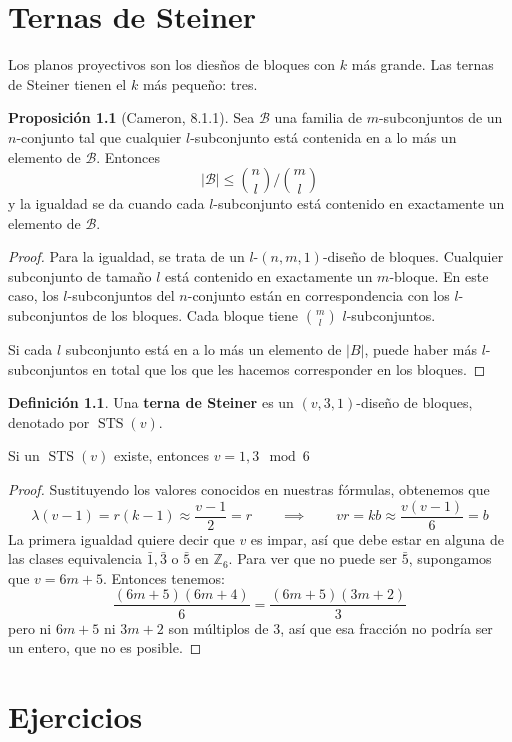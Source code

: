 \documentclass[spanish]{book}
\theoremstyle{definition}
\newtheorem*{defn}{Definición}
\newtheorem*{prop}{Proposición}
\newcommand{\Z}{\mathbb{Z}}
\DeclareMathOperator{\STS}{STS}
\begin{document}
\chapter{Ternas de Steiner}
Los planos proyectivos son los diesños de bloques con $k$ más grande. Las ternas de Steiner tienen el $k$ más pequeño: tres.
\begin{prop}[Cameron, 8.1.1]Sea $\mathcal{B}$ una familia de $m$-subconjuntos de un $n$-conjunto tal que cualquier $l$-subconjunto está contenida en a lo más un elemento de $\mathcal{B}$. Entonces
	\[|\mathcal{B}|\leq{n\choose l}\Big/{m\choose l}\]
	y la igualdad se da cuando cada $l$-subconjunto está contenido en exactamente un elemento de $\mathcal{B}$.
\end{prop}
\begin{proof}
	Para la igualdad, se trata de un $l$-$(n,m,1)$-diseño de bloques. Cualquier subconjunto de tamaño $l$ está contenido en exactamente un $m$-bloque. En este caso, los $l$-subconjuntos del $n$-conjunto están en correspondencia con los $l$-subconjuntos de los bloques. Cada bloque tiene ${m\choose l}$ $l$-subconjuntos.
	
	Si cada $l$ subconjunto está en a lo más un elemento de $|B|$, puede haber más $l$-subconjuntos en total que los que les hacemos corresponder en los bloques.
\end{proof}
\begin{defn}
	Una \textbf{terna de Steiner} es un $(v,3,1)$-diseño de bloques, denotado por $\STS(v)$.
\end{defn}
\begin{teo}
	Si un $\STS(v)$ existe, entonces $v=1,3\mod6$
\end{teo}
\begin{proof}
	Sustituyendo los valores conocidos en nuestras fórmulas, obtenemos que
	\[\lambda(v-1)=r(k-1)\approx\frac{v-1}{2}=r\qquad\implies\qquad vr=kb\approx \frac{v(v-1)}{6}=b\]
	La primera igualdad quiere decir que $v$ es impar, así que debe estar en alguna de las clases equivalencia $\bar{1},\bar{3}$ o $\bar{5}$ en $\Z_6$. Para ver que no puede ser $\bar{5}$, supongamos que $v=6m+5$. Entonces tenemos:
	\[\frac{(6m+5)(6m+4)}{6}=\frac{(6m+5)(3m+2)}{3}\]
	pero ni $6m+5$ ni $3m+2$ son múltiplos de $3$, así que esa fracción no podría ser un entero, que no es posible.
\end{proof}

\chapter{Ejercicios}
\end{document}
